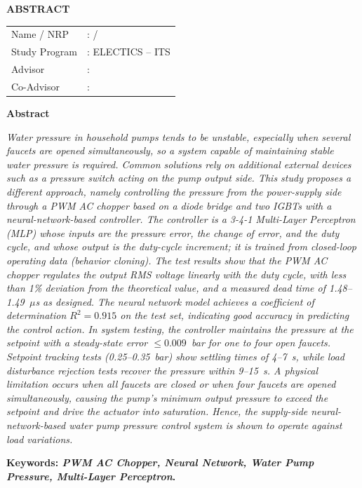 \begin{center}
  \fontsize{14}{17}\selectfont\textbf{ABSTRACT}
\end{center}


\vspace{2ex}

\begin{center}
  \fontsize{12}{15}\selectfont\textbf{\engtatitle{}}
\end{center}

\vspace{2ex}

\noindent
{\bfseries
\begin{tabular}{@{}p{4.3cm}l}
  Name / NRP & : \name{} / \nrp{} \\
  Study Program & : \engdepartment{} ELECTICS -- ITS \\
  Advisor    & : \advisor{} \\
  Co-Advisor & : \coadvisor{} \\
\end{tabular}
}

\vspace{2ex}

\noindent\textbf{Abstract}

\emph{Water pressure in household pumps tends to be unstable, especially when
several faucets are opened simultaneously, so a system capable of maintaining
stable water pressure is required. Common
solutions rely on additional external devices such as a pressure switch acting
on the pump output side. This study proposes a different approach, namely
controlling the pressure from the power-supply side through a PWM AC chopper
based on a diode bridge and two IGBTs with a neural-network-based controller. The controller is a 3-4-1
Multi-Layer Perceptron (MLP) whose inputs are the pressure error, the change of
error, and the duty cycle, and whose output is the duty-cycle increment; it is
trained from closed-loop operating data (behavior cloning). The test results show that the
PWM AC chopper regulates the output RMS
voltage linearly with the duty cycle, with less than 1\% deviation from the
theoretical value, and a measured dead time of 1.48--1.49~$\mu$s as designed.
The neural network model achieves a coefficient of determination $R^2 = 0.915$
on the test set, indicating good accuracy in predicting the control action. In system testing, the controller maintains the pressure at the setpoint with a
steady-state error $\leq 0.009$~bar for one to four open faucets. Setpoint
tracking tests (0.25--0.35~bar) show settling times of 4--7~s, while load
disturbance rejection tests recover the pressure within 9--15~s. A physical
limitation occurs when all faucets are closed or when four faucets are opened
simultaneously, causing the pump's minimum output pressure to exceed the setpoint
and drive the actuator into saturation. Hence, the supply-side
neural-network-based water pump pressure control system is shown to operate against load variations.}

\vspace{1ex}
\noindent\textbf{Keywords: \emph{PWM AC Chopper, Neural Network, Water Pump Pressure, Multi-Layer Perceptron}.}
